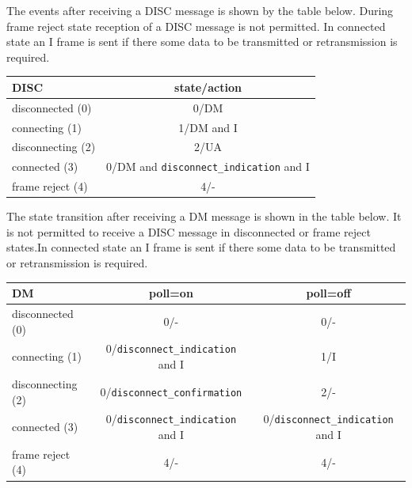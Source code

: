 \documentclass[a4paper]{article}
\begin{document}
The events after receiving a DISC message is shown by the table below. During frame reject state reception of a DISC
message is not permitted. In connected state an I frame is sent if there some data to be transmitted or retransmission
is required.

{\footnotesize
\begin{center}
    \begin{tabular}{|l|c|}
        \hline
        DISC              & state/action                                \\
        \hline
        disconnected (0)  & 0/DM                                        \\
        \hline
        connecting (1)    & 1/DM and I                                  \\
        \hline
        disconnecting (2) & 2/UA                                        \\
        \hline
        connected (3)     & 0/DM and \verb!disconnect_indication! and I  \\
        \hline
        frame reject (4)  & 4/-                                         \\
        \hline
    \end{tabular}
\end{center}
}

The state transition after receiving a DM message is shown in the table below. It is not permitted to receive a DISC
message in disconnected or frame reject states.In connected state an I frame is sent if there some data to be
transmitted or retransmission is required.

{\footnotesize
\begin{center}
    \begin{tabular}{|l|c|c|}
        \hline
        DM                & poll=on                             & poll=off                             \\
        \hline
        disconnected (0)  & 0/-                                 & 0/-                                  \\
        \hline
        connecting (1)    & 0/\verb!disconnect_indication! and I & 1/I                                  \\
        \hline
        disconnecting (2) & 0/\verb!disconnect_confirmation!       & 2/-                                  \\
        \hline
        connected (3)     & 0/\verb!disconnect_indication! and I & 0/\verb!disconnect_indication! and I  \\
        \hline
        frame reject (4)  & 4/-                                 & 4/-                                  \\
        \hline
    \end{tabular}
\end{center}
}
\end{document}
